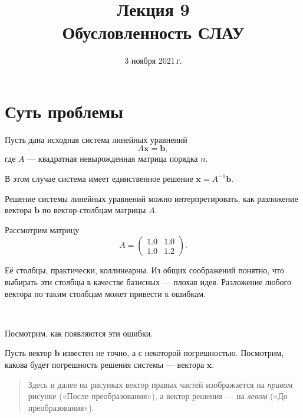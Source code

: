 \documentclass[11pt,a4paper]{article}
\title{Лекция 9 \\
    Обусловленность СЛАУ
    }
\date{3 ноября 2021\,г.}
\begin{document}
    
\maketitle
\thispagestyle{empty}
\tableofcontents
\pagebreak



    \hypertarget{ux441ux443ux442ux44c-ux43fux440ux43eux431ux43bux435ux43cux44b}{%
\section{Суть
проблемы}\label{ux441ux443ux442ux44c-ux43fux440ux43eux431ux43bux435ux43cux44b}}

Пусть дана исходная система линейных уравнений
\[ A \mathbf{x} = \mathbf{b}, \] где \(A\) --- квадратная невырожденная
матрица порядка \(n\).

В этом случае система имеет единственное решение
\(\mathbf{x} = A^{-1} \mathbf{b}\).

    Решение системы линейных уравнений можно интерпретировать, как
разложение вектора \(\mathbf{b}\) по вектор-столбцам матрицы \(A\).

Рассмотрим матрицу \[
  A = 
  \begin{pmatrix}
    1.0 & 1.0 \\
    1.0 & 1.2
  \end{pmatrix}.
\]

Её столбцы, практически, коллинеарны. Из общих соображений понятно, что
выбирать эти столбцы в качестве базисных --- плохая идея. Разложение
любого вектора по таким столбцам может привести к ошибкам.


    \begin{center}
    \end{center}
    { \hspace*{\fill} \\}
    
    Посмотрим, как появляются эти ошибки.

Пусть вектор \(\mathbf{b}\) известен не точно, а с некоторой
погрешностью. Посмотрим, какова будет погрешность решения системы ---
вектора \(\mathbf{x}\).

    \begin{quote}
Здесь и далее на рисунках вектор правых частей изображается на
\emph{правом} рисунке («После преобразования»), а вектор решения --- на
\emph{левом} («До преобразования»).
\end{quote}
\end{document}
